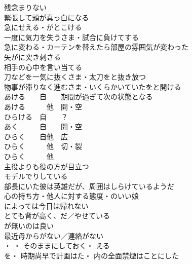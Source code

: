 残念まりない\\

緊張して頭が真っ白になる\\

急にせえる・がとこける\\
一度に気力を失うさま・試合に負けてする\\
急に変わる・カーテンを替えたら部屋の雰囲気が変わった\\
矢がに突き刺さる\\
相手の心中を言い当てる\\
刀などを一気に抜くさま・太刀をと抜き放つ\\
物事が滞りなく進むさま・いくらかいていたをと開ける\\

あける　　自　　期間が過ぎて次の状態となる\\
あける　　　他　開・空\\
ひらける　自　　？\\
あく　　　自　　開・空\\
ひらく　　自他　広\\
ひらく　　　他　切・裂\\
ひらく　　　他　\\

主役よりも役の方が目立つ\\

モデルでりしている\\
部長にいた彼は英雄だが、周囲はしらけているようだ\\
心の持ち方・他人に対する態度・のいい娘\\

によっては今日は帰れない\\

とても背が高く、だ／やせている\\

が無いのは良い\\
最近母からがない／連絡がない\\

・
・
そのままにしておく・
える　　\\
を・
時期尚早で計画はた・
内の全面禁煙はことにした\\

